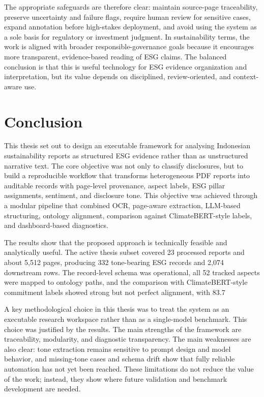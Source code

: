\documentclass[english, online, cse, master]{dithesis}
\begin{document}
The appropriate safeguards are therefore clear: maintain source-page traceability, preserve uncertainty and failure flags, require human review for sensitive cases, expand annotation before high-stakes deployment, and avoid using the system as a sole basis for regulatory or investment judgment. In sustainability terms, the work is aligned with broader responsible-governance goals because it encourages more transparent, evidence-based reading of ESG claims. The balanced conclusion is that this is useful technology for ESG evidence organization and interpretation, but its value depends on disciplined, review-oriented, and context-aware use.
   
\chapter{Conclusion}
  \label{summary}
  This thesis set out to design an executable framework for analysing Indonesian sustainability reports as structured ESG evidence rather than as unstructured narrative text. The core objective was not only to classify disclosures, but to build a reproducible workflow that transforms heterogeneous PDF reports into auditable records with page-level provenance, aspect labels, ESG pillar assignments, sentiment, and disclosure tone. This objective was achieved through a modular pipeline that combined OCR, page-aware extraction, LLM-based structuring, ontology alignment, comparison against ClimateBERT-style labels, and dashboard-based diagnostics.

The results show that the proposed approach is technically feasible and analytically useful. The active thesis subset covered 23 processed reports and about 5,512 pages, producing 332 tone-bearing ESG records and 2,074 downstream rows. The record-level schema was operational, all 52 tracked aspects were mapped to ontology paths, and the comparison with ClimateBERT-style commitment labels showed strong but not perfect alignment, with 83.7

A key methodological choice in this thesis was to treat the system as an executable research workspace rather than as a single-model benchmark. This choice was justified by the results. The main strengths of the framework are traceability, modularity, and diagnostic transparency. The main weaknesses are also clear: tone extraction remains sensitive to prompt design and model behavior, and missing-tone cases and schema drift show that fully reliable automation has not yet been reached. These limitations do not reduce the value of the work; instead, they show where future validation and benchmark development are needed.
\end{document}
